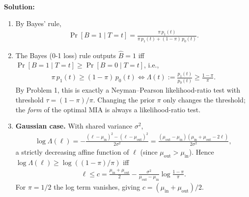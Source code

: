 \documentclass[12pt]{article}
\begin{document}
\begin{enumerate}
\begin{solution}
{\bf Solution:}\\
\begin{enumerate}
    \item By Bayes' rule,
    \begin{align*}
        \Pr[B = 1 \mid T = t] = \frac{\pi\, p_1(t)}{\pi\, p_1(t) + (1-\pi)\, p_0(t)}.
    \end{align*}

    \item The Bayes (0-1 loss) rule outputs $\hat B = 1$ iff $\Pr[B = 1 \mid T = t] \ge \Pr[B = 0 \mid T = t]$, i.e.,
    \begin{align*}
        \pi\, p_1(t) \ge (1-\pi)\, p_0(t) \iff \Lambda(t) := \frac{p_1(t)}{p_0(t)} \ge \frac{1-\pi}{\pi}.
    \end{align*}
    By Problem 1, this is exactly a Neyman--Pearson likelihood-ratio test with threshold $\tau = (1-\pi)/\pi$. Changing the prior $\pi$ only changes the threshold; the \emph{form} of the optimal MIA is always a likelihood-ratio test.

    \item \textbf{Gaussian case.} With shared variance $\sigma^2$,
    \begin{align*}
        \log\Lambda(\ell) = -\frac{(\ell - \mu_{\mathrm{in}})^2 - (\ell - \mu_{\mathrm{out}})^2}{2\sigma^2} = \frac{(\mu_{\mathrm{out}} - \mu_{\mathrm{in}})(\mu_{\mathrm{in}} + \mu_{\mathrm{out}} - 2\ell)}{2\sigma^2},
    \end{align*}
    a strictly decreasing affine function of $\ell$ (since $\mu_{\mathrm{out}} > \mu_{\mathrm{in}}$). Hence $\log\Lambda(\ell) \ge \log((1-\pi)/\pi)$ iff
    \begin{align*}
        \ell \le c = \frac{\mu_{\mathrm{in}} + \mu_{\mathrm{out}}}{2} - \frac{\sigma^2}{\mu_{\mathrm{out}} - \mu_{\mathrm{in}}}\log\frac{1-\pi}{\pi}.
    \end{align*}
    For $\pi = 1/2$ the log term vanishes, giving $c = (\mu_{\mathrm{in}} + \mu_{\mathrm{out}})/2$.
\end{enumerate}
\end{solution}


\end{enumerate}
\end{document}
